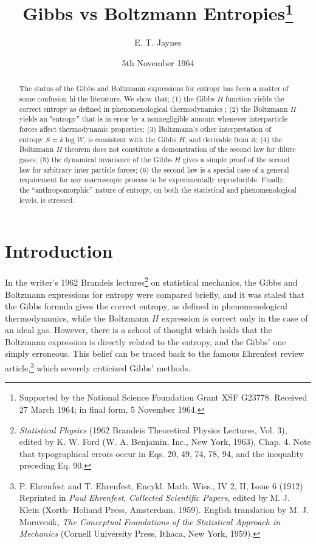 \documentclass[twocolumn]{article}
\title{Gibbs vs Boltzmann Entropies\footnote{Supported by the National
  Science Foundation Grant XSF G23778. Received 27 March 1964; in final form, 5 November 1964.}}
\author{E. T. Jaynes}
\date{5th November 1964}
\affil{Department of Physics, Washington University, St. Louis, Missouri}
\begin{document}
\maketitle


\begin{abstract}
The status of the Gibbs and Boltzmann expressions for entropy has been
a matter of some confusion hi the literature. We show that; (1) the
Gibbs $H$ function yields the correct entropy as defined in
phenomenological thermodynamics ; (2) the Boltzmann $H$ yields an
"entropy'' that is in error by a nonnegligible amount whenever
interparticle forces affect thermodynamic properties; (3) Boltzmann's
other interpretation of entropy $S = k\log W$, is consistent with
the Gibbs $H$, and derivable from it; (4) the Boltzmann $H$
theorem does not constitute a demonstration of the second law for dilute
gases; (5) the dynamical invariance of the Gibbs $H$ gives a simple
proof of the second law for arbitrary inter particle forces; (6) the
second law is a special case of a general requirement for any
macroscopic process to be experimentally reproducible. Finally, the
``anthropomorphic'' nature of entropy, on both the statistical and
phenomenological levels, is stressed.
\end{abstract}

\section{Introduction}\label{sec-introduction}

In the writer's 1962 Brandeis lectures\footnote{\emph{Statistical
  Physics} (1962 Brandeis Theoretical Physics Lectures, Vol. 3), edited
  by K. W. Ford (W. A. Benjamin, Inc., New York, 1963), Chap. 4. Note
  that typographical errors occur in Eqs. 20, 49, 74, 78, 94, and the
  inequality preceding Eq. 90.} on statistical mechanics, the Gibbs and
Boltzmann expressions for entropy were compared briefly, and it was
staled that the Gibbs formula gives the correct entropy, as defined in
phenomenological thermodynamics, while the Boltzmann $H$ expression
is correct only in the case of an ideal gas. However, there is a school
of thought which holds that the Boltzmann expression is directly related
to the entropy, and the Gibbs' one simply erroneous. This belief can be
traced back to the famous Ehrenfest review article,\footnote{P.
  Ehrenfest and T. Ehrenfest, Encykl. Math. Wiss., IV 2, II, Issue 6
  (1912) Reprinted in \emph{Paul Ehrenfest}, \emph{Collected Scientific
  Papers}, edited by M. J. Klein (Xorth- Holiand Press, Amsterdam,
  1959). English translation by M. J. Moravcsik, \emph{The Conceptual
  Foundations of the Statistical Approach in Mechanics} (Cornell
  University Press, Ithaca, New York, 1959).} which severely criticized
Gibbs' methods.
\end{document}
